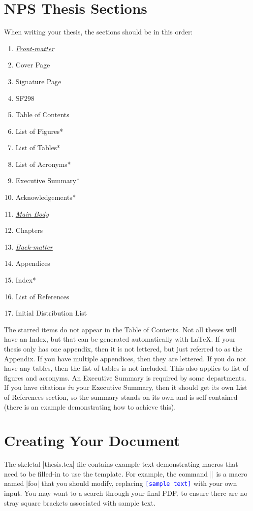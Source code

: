 \section{NPS Thesis Sections}
When writing your thesis, the sections should be in this order:
\begin{enumerate}
  \item[] \hspace{-3em} \underline{\textit{Front-matter}}
  \item Cover Page
  \item Signature Page
  \item SF298
  \item Table of Contents
  \item List of Figures*
  \item List of Tables*
  \item List of Acronyms*
  \item Executive Summary*
  \item Acknowledgements*
  \item[] \hspace{-3em} \underline{\textit{Main Body}}
  \item Chapters
  \item[] \hspace{-3em} \underline{\textit{Back-matter}}
  \item Appendices
  \item Index*
  \item List of References
  \item Initial Distribution List
\end{enumerate}

The starred items do not appear in the Table of Contents.  Not all theses
will have an Index, but that can be generated automatically with
\LaTeX{}.  If your thesis only has one appendix, then it is not
lettered, but just referred to as the Appendix.  If you have multiple
appendices, then they are lettered.  If you do not have any tables,
then the list of tables is not included.  This also applies to list of
figures and acronyms.  An Executive Summary is required by
some departments.
If you have citations \emph{in} your Executive Summary, then it should get
its own List of References section, so the summary stands on its own and 
is self-contained (there is an example demonstrating how to achieve this).


\section{Creating Your Document}
The skeletal |thesis.tex| file contains example
text demonstrating macros that need to be filled-in to use the template.
For example, the command ||
is a macro named |foo| that you should modify, replacing
\textcolor{blue}{\texttt{[sample text]}} with your own input.
You may want to a search through your final PDF, to ensure there are no
stray square brackets associated with sample text.

